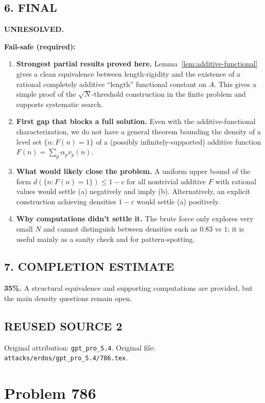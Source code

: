 \subsection*{6. FINAL}
\textbf{UNRESOLVED.}

\medskip
\noindent\textbf{Fail-safe (required):}
\begin{enumerate}[leftmargin=2em,label=(\roman*)]
\item \textbf{Strongest partial results proved here.}
Lemma~\ref{lem:additive-functional} gives a clean equivalence between length-rigidity and the existence of a rational completely additive ``length'' functional constant on $A$. This gives a simple proof of the $\sqrt N$-threshold construction in the finite problem and supports systematic search.
\item \textbf{First gap that blocks a full solution.}
Even with the additive-functional characterization, we do not have a general theorem bounding the density of a level set $\{n: F(n)=1\}$ of a (possibly infinitely-supported) additive function $F(n)=\sum_p \alpha_p v_p(n)$.
\item \textbf{What would likely close the problem.}
A uniform upper bound of the form $d(\{n: F(n)=1\})\le 1-c$ for all nontrivial additive $F$ with rational values would settle (a) negatively and imply (b). Alternatively, an explicit construction achieving densities $1-\varepsilon$ would settle (a) positively.
\item \textbf{Why computations didn't settle it.}
The brute force only explores very small $N$ and cannot distinguish between densities such as $0.83$ vs $1$; it is useful mainly as a sanity check and for pattern-spotting.
\end{enumerate}

\subsection*{7. COMPLETION ESTIMATE}
\textbf{35\%.} A structural equivalence and supporting computations are provided, but the main density questions remain open.



\subsection*{REUSED SOURCE 2}
Original attribution: \texttt{gpt\_pro\_5.4}.
Original file: \texttt{attacks/erdos/gpt\_pro\_5.4/786.tex}.

\section{Problem 786}

